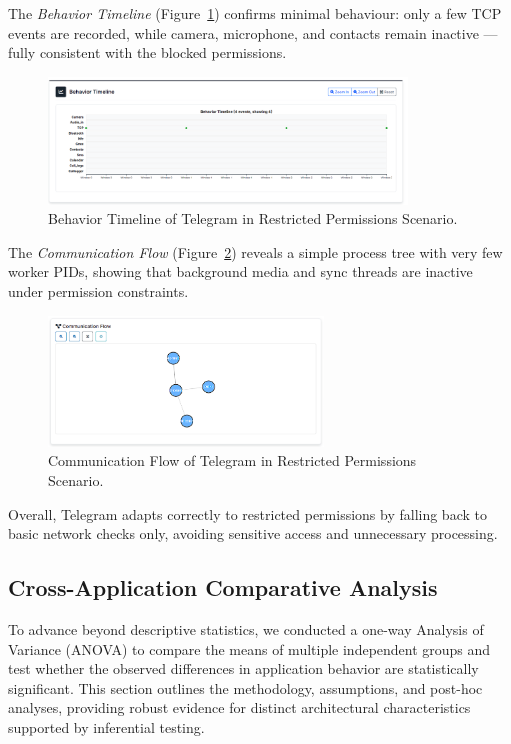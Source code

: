 \documentclass[a4paper,12pt]{report}
\begin{document}
The \textit{Behavior Timeline} (Figure~\ref{fig:telegram-none-behav}) confirms minimal behaviour: only a few TCP events are recorded, while camera, microphone, and contacts remain inactive — fully consistent with the blocked permissions.

\begin{figure}[H]
    \centering
    \includegraphics[width=0.85\textwidth]{telegram-none-behav.png}
    \caption{Behavior Timeline of Telegram in Restricted Permissions Scenario.}
    \label{fig:telegram-none-behav}
\end{figure}

The \textit{Communication Flow} (Figure~\ref{fig:telegram-none-flow}) reveals a simple process tree with very few worker PIDs, showing that background media and sync threads are inactive under permission constraints.

\begin{figure}[H]
    \centering
    \includegraphics[width=0.65\textwidth]{telegram-none-flow.png}
    \caption{Communication Flow of Telegram in Restricted Permissions Scenario.}
    \label{fig:telegram-none-flow}
\end{figure}

Overall, Telegram adapts correctly to restricted permissions by falling back to basic network checks only, avoiding sensitive access and unnecessary processing.

\subsection{Cross-Application Comparative Analysis}

To advance beyond descriptive statistics, we conducted a one-way Analysis of Variance (ANOVA) to compare the means of multiple independent groups and test whether the observed differences in application behavior are statistically significant. This section outlines the methodology, assumptions, and post-hoc analyses, providing robust evidence for distinct architectural characteristics supported by inferential testing.
\end{document}

